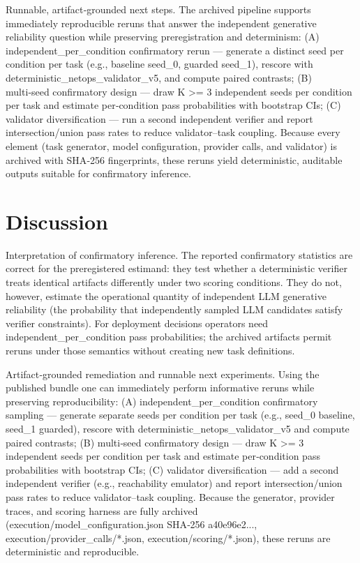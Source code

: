 \documentclass[conference]{IEEEtran}
\begin{document}
Runnable, artifact‑grounded next steps. The archived pipeline supports immediately reproducible reruns that answer the independent generative reliability question while preserving preregistration and determinism: (A) independent\_per\_condition confirmatory rerun --- generate a distinct seed per condition per task (e.g., baseline seed\_0, guarded seed\_1), rescore with deterministic\_netops\_validator\_v5, and compute paired contrasts; (B) multi‑seed confirmatory design --- draw K >= 3 independent seeds per condition per task and estimate per‑condition pass probabilities with bootstrap CIs; (C) validator diversification --- run a second independent verifier and report intersection/union pass rates to reduce validator--task coupling. Because every element (task generator, model configuration, provider calls, and validator) is archived with SHA‑256 fingerprints, these reruns yield deterministic, auditable outputs suitable for confirmatory inference.

\section{Discussion}
Interpretation of confirmatory inference. The reported confirmatory statistics are correct for the preregistered estimand: they test whether a deterministic verifier treats identical artifacts differently under two scoring conditions. They do not, however, estimate the operational quantity of independent LLM generative reliability (the probability that independently sampled LLM candidates satisfy verifier constraints). For deployment decisions operators need independent\_per\_condition pass probabilities; the archived artifacts permit reruns under those semantics without creating new task definitions.

Artifact‑grounded remediation and runnable next experiments. Using the published bundle one can immediately perform informative reruns while preserving reproducibility: (A) independent\_per\_condition confirmatory sampling --- generate separate seeds per condition per task (e.g., seed\_0 baseline, seed\_1 guarded), rescore with deterministic\_netops\_validator\_v5 and compute paired contrasts; (B) multi‑seed confirmatory design --- draw K >= 3 independent seeds per condition per task and estimate per‑condition pass probabilities with bootstrap CIs; (C) validator diversification --- add a second independent verifier (e.g., reachability emulator) and report intersection/union pass rates to reduce validator--task coupling. Because the generator, provider traces, and scoring harness are fully archived (execution/model\_configuration.json SHA‑256 a40e96e2..., execution/provider\_calls/*.json, execution/scoring/*.json), these reruns are deterministic and reproducible.
\end{document}
